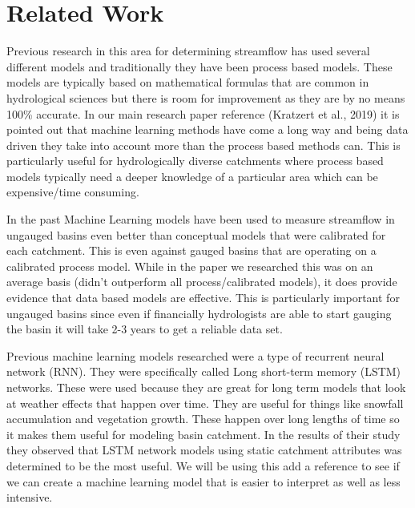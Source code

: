 \section{Related Work}\label{related-work}

Previous research in this area for determining streamflow has used
several different models and traditionally they have been process based
models. These models are typically based on mathematical formulas that
are common in hydrological sciences but there is room for improvement as
they are by no means 100\% accurate. In our main research paper
reference (Kratzert et al., 2019) it is pointed out that machine
learning methods have come a long way and being data driven they take
into account more than the process based methods can. This is
particularly useful for hydrologically diverse catchments where process
based models typically need a deeper knowledge of a particular area
which can be expensive/time consuming.

In the past Machine Learning models have been used to measure streamflow
in ungauged basins even better than conceptual models that were
calibrated for each catchment. This is even against gauged basins that
are operating on a calibrated process model. While in the paper we
researched this was on an average basis (didn't outperform all
process/calibrated models), it does provide evidence that data based
models are effective. This is particularly important for ungauged basins
since even if financially hydrologists are able to start gauging the
basin it will take 2-3 years to get a reliable data set.

Previous machine learning models researched were a type of recurrent
neural network (RNN). They were specifically called Long short-term
memory (LSTM) networks. These were used because they are great for long
term models that look at weather effects that happen over time. They are
useful for things like snowfall accumulation and vegetation growth.
These happen over long lengths of time so it makes them useful for
modeling basin catchment. In the results of their study they observed
that LSTM network models using static catchment attributes was
determined to be the most useful. We will be using this add a reference
to see if we can create a machine learning model that is easier to
interpret as well as less intensive.
